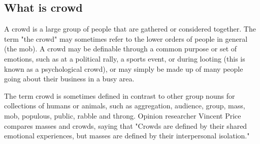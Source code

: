 \subsection{What is crowd}
A crowd is a large group of people that are gathered or considered together. The
term "the crowd" may sometimes refer to the lower orders of people in general (the
mob). A crowd may be definable through a common purpose or set of emotions, such as
at a political rally, a sports event, or during looting (this is known as a psychological
crowd), or may simply be made up of many people going about their business in a busy
area.\par
The term crowd is sometimes defined in contrast to other group nouns for
collections of humans or animals, such as aggregation, audience, group, mass, mob,
populous, public, rabble and throng. Opinion researcher Vincent Price compares masses
and crowds, saying that "Crowds are defined by their shared emotional experiences, but
masses are defined by their interpersonal isolation."
